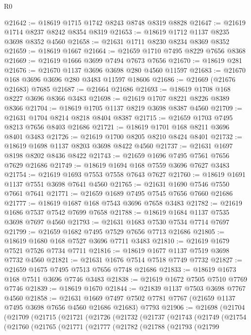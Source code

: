 \begin{lexlean}{R0}
\begin{coremodule}
@21642 := @18619 @1715 @1742 @8243 @8748 @8319 @8828
@21647 := @21619 @1714 @8237 @8242 @8354 @8319
@21653 := @18619 @1712 @1137 @8235 @3698 @8352 @4560
@21658 := @21631 @1711 @8230 @8234 @8369 @8352
@21659 := @18619 @1667
@21664 := @21659 @1710 @7495 @8229 @7656 @8368
@21669 := @21619 @1666 @3699 @7494 @7673 @7656
@21670 := @18619 @281
@21676 := @21670 @1137 @3696 @3698 @280 @4560 @11597
@21683 := @21670 @168 @3696 @3696 @280 @3483 @11597 @18606
@21686 := @21669 (@21676 @21683) @7685
@21687 := @21664 @21686
@21693 := @18619 @1708 @168 @8227 @3696 @8366 @3483
@21698 := @21619 @1707 @8221 @8226 @8389 @8366
@21704 := @18619 @1705 @1137 @8219 @3698 @8387 @4560
@21709 := @21631 @1704 @8214 @8218 @8404 @8387
@21715 := @21659 @1703 @7495 @8213 @7656 @8403 @21686
@21721 := @18619 @1701 @168 @8211 @3696 @8401 @3483
@21726 := @21619 @1700 @8205 @8210 @8424 @8401
@21732 := @18619 @1698 @1137 @8203 @3698 @8422 @4560
@21737 := @21631 @1697 @8198 @8202 @8436 @8422
@21743 := @21659 @1696 @7495 @7561 @7656 @7629 @21686
@21749 := @18619 @1694 @168 @7559 @3696 @7627 @3483
@21754 := @21619 @1693 @7553 @7558 @7643 @7627
@21760 := @18619 @1691 @1137 @7551 @3698 @7641 @4560
@21765 := @21631 @1690 @7546 @7550 @7661 @7641
@21771 := @21659 @1689 @7495 @7545 @7656 @7660 @21686
@21777 := @18619 @1687 @168 @7543 @3696 @7658 @3483
@21782 := @21619 @1686 @7537 @7542 @7699 @7658
@21788 := @18619 @1684 @1137 @7535 @3698 @7697 @4560
@21793 := @21631 @1683 @7530 @7534 @7714 @7697
@21799 := @21659 @1682 @7495 @7529 @7656 @7713 @21686
@21805 := @18619 @1680 @168 @7527 @3696 @7711 @3483
@21810 := @21619 @1679 @7521 @7526 @7734 @7711
@21816 := @18619 @1677 @1137 @7519 @3698 @7732 @4560
@21821 := @21631 @1676 @7514 @7518 @7749 @7732
@21827 := @21659 @1675 @7495 @7513 @7656 @7748 @21686
@21833 := @18619 @1673 @168 @7511 @3696 @7746 @3483
@21838 := @21619 @1672 @7505 @7510 @7769 @7746
@21839 := @18619 @1670
@21844 := @21839 @1137 @7503 @3698 @7767 @4560
@21858 := @21631
    @1669
    @7497
    @7502
    @7781
    @7767
    (@21659 @1137 @7495 @3698 @7656 @4560 @21686 @21683)
    @7793
@21906 := @21698
    (@21704
      (@21709
        (@21715
          (@21721
            (@21726
              (@21732
                (@21737
                  (@21743
                    (@21749
                      (@21754
                        (@21760
                          (@21765
                            (@21771
                              (@21777
                                (@21782
                                  (@21788
                                    (@21793
                                      (@21799

\end{coremodule}
\end{lexlean}
